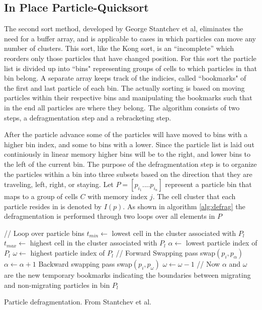 	\subsection{In Place Particle-Quicksort}
	The second sort method, developed by George Stantchev et al, eliminates the need for a buffer array, and is applicable to cases in which particles can move any number of clusters. This sort, like the Kong sort, is an ``incomplete'' which reorders only those particles that have changed position. For this sort the particle list is divided up into ``bins" representing groups of cells to which particles in that bin belong. A separate array keeps track of the indicies, called ``bookmarks" of the first and last particle of each bin. The actually sorting is based on moving particles within their respective bins and manipulating the bookmarks such that in the end all particles are where they belong. The algorithm consists of two steps, a defragmentation step and a rebracketing step. 
	
	After the particle advance some of the particles will have moved to bins with a higher bin index, and some to bins with a lower. Since the particle list is laid out continiously in linear memory higher bins will be to the right, and lower bins to the left of the current bin. The purpose of the defragmentation step is to organize the particles within a bin into three subsets based on the direction that they are traveling, left, right, or staying. Let $P = [p_{i_1}.... p_{i_n}]$ represent a particle bin that maps to a group of cells $C$ with memory index $j$. The cell cluster that each particle resides in is denoted by $I(p)$. As shown in algorithm \ref{alg:defrag} the defragmentation is performed through two loops over all elements in $P$

\begin{algorithm}
	\begin{algorithmic}
		\STATE // Loop over particle bins
			\STATE $t_{min} \leftarrow$ lowest cell in the cluster associated with $P_l$
			\STATE $t_{max} \leftarrow$ highest cell in the cluster associated with $P_l$
			\STATE $\alpha \leftarrow$ lowest particle index of  $P_l$
			\STATE $\omega \leftarrow$ highest particle index of $P_l$
			\STATE // Forward Swapping pass 
					\STATE swap$(p_i, p_{\alpha})$
					\STATE $\alpha \leftarrow \alpha + 1$
				\ENDIF			
			\ENDFOR
			\STATE Backward swapping pass
					\STATE swap$(p_i, p_{\omega})$
					\STATE $\omega \leftarrow \omega - 1$
				\ENDIF			
			\ENDFOR
			\STATE // Now $\alpha$ and $\omega$ are the new temporary bookmarks indicating the boundaries between migrating and non-migrating particles in bin $P_l$
		\ENDFOR
	\end{algorithmic}
	\caption{Particle defragmentation. From Stantchev et al. \cite{Stantchev2008}}
	\label{alg:defrag}
\end{algorithm}


